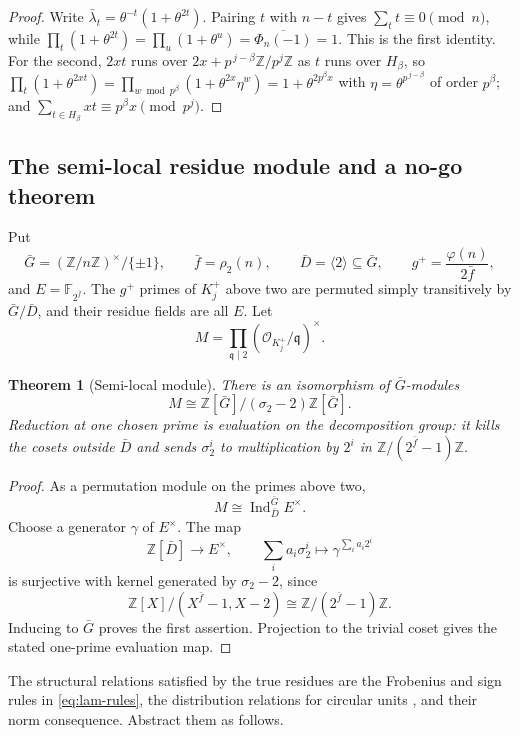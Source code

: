 \documentclass[a4paper]{article}
\newtheorem{theorem}{Theorem}[section]
\newcommand{\F}{\mathbb{F}}
\newcommand{\Z}{\mathbb{Z}}
\begin{document}
\begin{proof}
	Write $\bar\lambda_t=\theta^{-t}(1+\theta^{2t})$.  Pairing $t$ with
	$n-t$ gives $\sum_{t}t\equiv0\pmod n$, while
	$\prod_{t}(1+\theta^{2t})=\prod_{u}(1+\theta^{u})
	=\overline{\Phi_{n}(-1)}=1$.  This is the first identity.
	For the second, $2xt$ runs over $2x+p^{\,j-\beta}\Z/p^{j}\Z$ as $t$
	runs over $H_\beta$, so
	$\prod_{t}(1+\theta^{2xt})=\prod_{w\bmod p^{\beta}}
	(1+\theta^{2x}\eta^{w})=1+\theta^{2p^{\beta}x}$ with
	$\eta=\theta^{p^{\,j-\beta}}$ of order $p^{\beta}$;
	and $\sum_{t\in H_\beta}xt\equiv p^{\beta}x\pmod{p^{j}}$.
\end{proof}

\subsection{The semi-local residue module and a no-go theorem}
\label{sec:module}

Put
\[
	\bar G=(\Z/n\Z)^\times/\{\pm1\},\qquad
	\bar f=\rho_2(n),\qquad
	\bar D=\langle2\rangle\subseteq\bar G,\qquad
	g^+=\frac{\varphi(n)}{2\bar f},
\]
and $E=\F_{2^{\bar f}}$.  The $g^+$ primes of $K_j^+$ above two are
permuted simply transitively by $\bar G/\bar D$, and their residue fields
are all $E$.  Let
\[
	M=\prod_{\mathfrak q\mid2}
		(\mathcal O_{K_j^+}/\mathfrak q)^\times.
\]

\begin{theorem}[Semi-local module]\label{thm:semilocal-module}
	There is an isomorphism of $\bar G$-modules
	\[
		M\cong\Z[\bar G]/(\sigma_2-2)\Z[\bar G].
	\]
	Reduction at one chosen prime is evaluation on the decomposition
	group: it kills the cosets outside $\bar D$ and sends
	$\sigma_2^i$ to multiplication by $2^i$ in
	$\Z/(2^{\bar f}-1)\Z$.
\end{theorem}

\begin{proof}
	As a permutation module on the primes above two,
	\[
		M\cong\operatorname{Ind}_{\bar D}^{\bar G}E^\times.
	\]
	Choose a generator $\gamma$ of $E^\times$.  The map
	\[
		\Z[\bar D]\longrightarrow E^\times,\qquad
		\sum_i a_i\sigma_2^i\longmapsto
		\gamma^{\sum_i a_i2^i}
	\]
	is surjective with kernel generated by $\sigma_2-2$, since
	\[
		\Z[X]/(X^{\bar f}-1,X-2)
		\cong\Z/(2^{\bar f}-1)\Z.
	\]
	Inducing to $\bar G$ proves the first assertion.  Projection to the
	trivial coset gives the stated one-prime evaluation map.
\end{proof}

The structural relations satisfied by the true residues are the
Frobenius and sign rules in \eqref{eq:lam-rules}, the distribution
relations for circular units \cite{Sinnott1978,Sinnott1980,KubertLang1981},
and their norm consequence.  Abstract them as follows.
\end{document}
